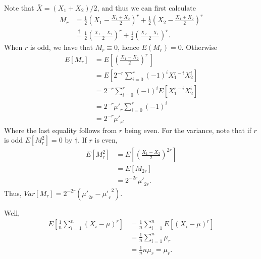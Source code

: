 \documentclass{stat_homework}
\begin{document}
  

  \begin{solution}
  Note that $\bar X = (X_1 + X_2)/2$, and thus we can first calculate
  \begin{align*}
    M_r 
    &= \frac 12 \left(X_1 - \frac{X_1 + X_2}{2}\right)^r + \frac12 \left(X_2 - \frac{X_1 + X_2}{2}\right)^r\\
    &\stackrel{\dagger}{=} \frac 12 \left(\frac{X_1 - X_2}{2}\right)^r + \frac12 \left(\frac{X_2 - X_1}{2}\right)^r.
  \end{align*} 
  When $r$ is odd, we have that $M_r \equiv 0$, hence $E(M_r) = 0$.  Otherwise
  \begin{align*}
  E[M_r] 
    &= E\left[\left(\frac{X_1 - X_2}{2}\right)^r\, \right]\\
    &= E\left[2^{-r}\sum_{i=0}^r (-1)^i X_1^{r-i} X_2^i \right]\\
    &= 2^{-r}\sum_{i=0}^r (-1)^i E\left[X_1^{r-i}X_2^i\right]  \\
    &= 2^{-r}{\mu'}_{r}\sum_{i=0}^r (-1)^i\\
    &= 2^{-r}{\mu'}_{r},
  \end{align*} 
  Where the last equality follows from $r$ being even. For the variance, note that if $r$ is odd $E\left[M_r^2\right] = 0$ by $\dagger$.  If $r$ is even, 
  \begin{align*}
    E\left[M_r^2\right] &= E\left[ \left(\frac{X_1 - X_2}{2}\right)^{2r}\right] \\ & = E\left[ M_{2r} \right]\\
    & = 2^{-2r} {\mu'}_{2r}.
  \end{align*}
  Thus, $Var[M_r] = 2^{-2r}({\mu'}_{2r} - {{\mu'}_r}^2).$

  \end{solution}


  \begin{solution}
  Well, 
  \begin{align*}
    E\left[\frac 1n \sum_{i=1}^n \left(X_i - \mu\right)^r\right] 
    &= \frac 1n \sum_{i=1}^nE\left[ \left(X_i - \mu\right)^r\right] \\
    &= \frac 1n \sum_{i=1}^n \mu_r \\
    &= \frac 1n n \mu_r = \mu_r. 
  \end{align*}
  \end{solution}
\end{document}
